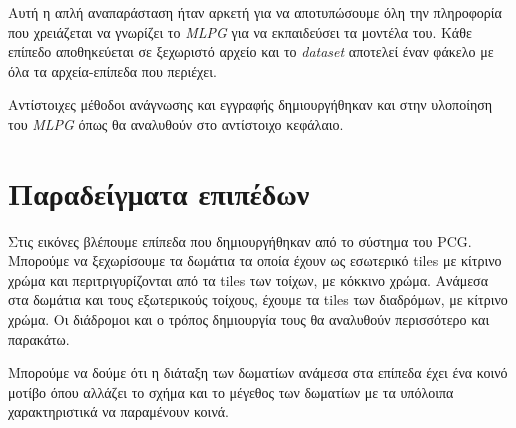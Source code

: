 Αυτή η απλή αναπαράσταση ήταν αρκετή για να αποτυπώσουμε όλη την πληροφορία που χρειάζεται να γνωρίζει το \textit{MLPG} για να εκπαιδεύσει τα μοντέλα του. Κάθε επίπεδο αποθηκεύεται σε ξεχωριστό αρχείο και το \textit{dataset} αποτελεί έναν φάκελο με όλα τα αρχεία-επίπεδα που περιέχει.
\par
Αντίστοιχες μέθοδοι ανάγνωσης και εγγραφής δημιουργήθηκαν και στην υλοποίηση του \textit{MLPG} όπως θα αναλυθούν στο αντίστοιχο κεφάλαιο.

\section{Παραδείγματα επιπέδων}
\par
Στις εικόνες βλέπουμε επίπεδα που δημιουργήθηκαν από το σύστημα του PCG. Μπορούμε να ξεχωρίσουμε τα δωμάτια τα οποία έχουν ως εσωτερικό tiles με κίτρινο χρώμα και περιτριγυρίζονται από τα tiles των τοίχων, με κόκκινο χρώμα. Ανάμεσα στα δωμάτια και τους εξωτερικούς τοίχους, έχουμε τα tiles των διαδρόμων, με κίτρινο χρώμα. Οι διάδρομοι και ο τρόπος δημιουργία τους θα αναλυθούν περισσότερο και παρακάτω.
\par
Μπορούμε να δούμε ότι η διάταξη των δωματίων ανάμεσα στα επίπεδα έχει ένα κοινό μοτίβο όπου αλλάζει το σχήμα και το μέγεθος των δωματίων με τα υπόλοιπα χαρακτηριστικά να παραμένουν κοινά.

